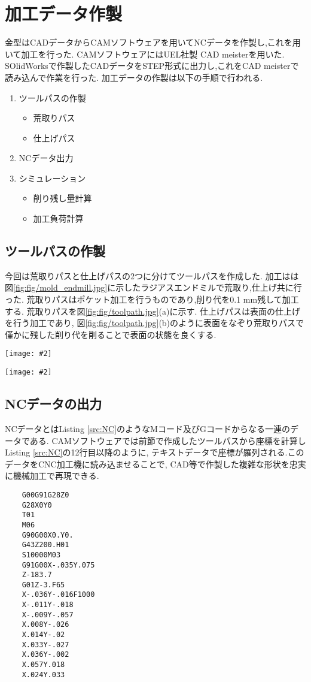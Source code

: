 \documentclass[uplatex,a4j,11pt,dvipdfmx]{jsreport}
\makeatletter
\def\fgcaption{\def\@captype{figure}\caption}
\newcommand{\mfig}[3][width=15cm]{
\begin{center}
\texttt{[image: \#2]}
\fgcaption{#3 \label{fig:#2}}
\end{center}
}
\makeatother
\begin{document}
  \section{加工データ作製}
  金型はCADデータからCAMソフトウェアを用いてNCデータを作製し,これを用いて加工を行った.
  CAMソフトウェアにはUEL社製 CAD meisterを用いた.
  SOlidWorksで作製したCADデータをSTEP形式に出力し,これをCAD meisterで読み込んで作業を行った.
  加工データの作製は以下の手順で行われる.
  \begin{enumerate}
    \item ツールパスの作製\begin{itemize}
      \item 荒取りパス
      \item 仕上げパス
    \end{itemize}
    \item NCデータ出力
    \item シミュレーション\begin{itemize}
      \item 削り残し量計算
      \item 加工負荷計算
    \end{itemize}
  \end{enumerate}\clearpage
  \subsection{ツールパスの作製}
  今回は荒取りパスと仕上げパスの2つに分けてツールパスを作成した.
  加工はは図\ref{fig:fig/mold_endmill.jpg}に示したラジアスエンドミルで荒取り,仕上げ共に行った.
  荒取りパスはポケット加工を行うものであり,削り代を0.1 mm残して加工する.
  荒取りパスを図\ref{fig:fig/toolpath.jpg}(a)に示す.
  仕上げパスは表面の仕上げを行う加工であり,
  図\ref{fig:fig/toolpath.jpg}(b)のように表面をなぞり荒取りパスで僅かに残した削り代を削ることで表面の状態を良くする.
  \mfig[width=3cm]{fig/mold_endmill.jpg}{加工に用いるエンドミル}
  \mfig[width=14cm]{fig/toolpath.jpg}{(a)荒取りパス, (b)仕上げパス}
  \subsection{NCデータの出力}
  NCデータとはListing \ref{src:NC}のようなMコード及びGコードからなる一連のデータである.
  CAMソフトウェアでは前節で作成したツールパスから座標を計算しListing \ref{src:NC}の12行目以降のように,
  テキストデータで座標が羅列される.このデータをCNC加工機に読み込ませることで,
  CAD等で作製した複雑な形状を忠実に機械加工で再現できる.
  \begin{lstlisting}[caption=作製した荒取り加工NCデータの冒頭20行,label=src:NC]
    %
    G00G91G28Z0
    G28X0Y0
    T01
    M06
    G90G00X0.Y0.
    G43Z200.H01
    S10000M03
    G91G00X-.035Y.075
    Z-183.7
    G01Z-3.F65
    X-.036Y-.016F1000
    X-.011Y-.018
    X-.009Y-.057
    X.008Y-.026
    X.014Y-.02
    X.033Y-.027
    X.036Y-.002
    X.057Y.018
    X.024Y.033
  \end{lstlisting}
\end{document}
